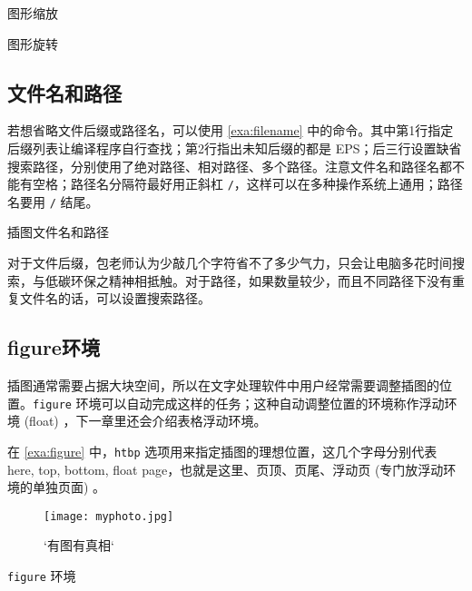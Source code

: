 \begin{example}[htbp]
\caption{图形缩放}
\label{exa:graph_zoom}
\end{example}

\begin{example}[htbp]
\caption{图形旋转}
\label{exa:graph_rotate}
\end{example}

\subsection{文件名和路径}

若想省略文件后缀或路径名，可以使用 \autoref{exa:filename} 中的命令。其中第1行指定后缀列表让编译程序自行查找；第2行指出未知后缀的都是 EPS；后三行设置缺省搜索路径，分别使用了绝对路径、相对路径、多个路径。注意文件名和路径名都不能有空格；路径名分隔符最好用正斜杠 \verb|/|，这样可以在多种操作系统上通用；路径名要用 \verb|/| 结尾。

\begin{example}[h]
\begin{Code}[numbers=left]
\graphicspath{{c:/secret-garden/}}
\graphicspath{{./img/}}
\graphicspath{{one-little/}{two-little/}{three-little-indians/}}
\end{Code}
\caption{插图文件名和路径}
\label{exa:filename}
\end{example}

对于文件后缀，包老师认为少敲几个字符省不了多少气力，只会让电脑多花时间搜索，与低碳环保之精神相抵触。对于路径，如果数量较少，而且不同路径下没有重复文件名的话，可以设置搜索路径。

\subsection{figure环境}

插图通常需要占据大块空间，所以在文字处理软件中用户经常需要调整插图的位置。\texttt{figure} 环境可以自动完成这样的任务；这种自动调整位置的环境称作浮动环境 (float) ，下一章里还会介绍表格浮动环境。

在 \autoref{exa:figure} 中，\texttt{htbp} 选项用来指定插图的理想位置，这几个字母分别代表 here, top, bottom, float page，也就是这里、页顶、页尾、浮动页 (专门放浮动环境的单独页面) 。

\begin{example}[h]
\begin{Code}[numbers=left]
\begin{figure}[htbp]
\centering
\texttt{[image: myphoto.jpg]}
\caption{`有图有真相`}
\label{fig:myphoto}
\end{figure}
\end{Code}
\caption{\texttt{figure} 环境}
\label{exa:figure}
\end{example}

